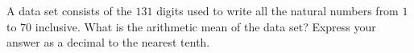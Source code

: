 A data set consists of the $131$ digits used to write all the natural numbers from $1$ to $70$ inclusive. What is the arithmetic mean of the data set? Express your answer as a decimal to the nearest tenth.
